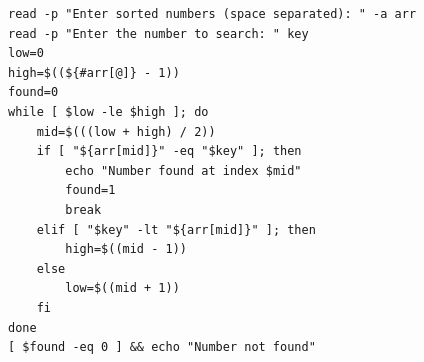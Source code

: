 \begin{verbatim}
read -p "Enter sorted numbers (space separated): " -a arr
read -p "Enter the number to search: " key
low=0
high=$((${#arr[@]} - 1))
found=0
while [ $low -le $high ]; do
    mid=$(((low + high) / 2))
    if [ "${arr[mid]}" -eq "$key" ]; then
        echo "Number found at index $mid"
        found=1
        break
    elif [ "$key" -lt "${arr[mid]}" ]; then
        high=$((mid - 1))
    else
        low=$((mid + 1))
    fi
done
[ $found -eq 0 ] && echo "Number not found"
\end{verbatim}